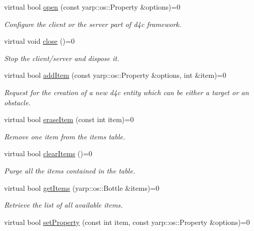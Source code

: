 \begin{DoxyCompactItemize}
\item 
virtual bool \hyperlink{classiCub_1_1d4c_1_1D4C_a75eea02600be0bebb85d0deddd6ecb8e}{open} (const yarp\+::os\+::\+Property \&options)=0
\begin{DoxyCompactList}\small\item\em Configure the client or the server part of d4c framework. \end{DoxyCompactList}\item 
virtual void \hyperlink{classiCub_1_1d4c_1_1D4C_a2b1d795a30a93b5ed76d91a13a545038}{close} ()=0
\begin{DoxyCompactList}\small\item\em Stop the client/server and dispose it. \end{DoxyCompactList}\item 
virtual bool \hyperlink{classiCub_1_1d4c_1_1D4C_ae24c8b8dfa644fbb10ac87741fe0dbc0}{add\+Item} (const yarp\+::os\+::\+Property \&options, int \&item)=0
\begin{DoxyCompactList}\small\item\em Request for the creation of a new d4c entity which can be either a target or an obstacle. \end{DoxyCompactList}\item 
virtual bool \hyperlink{classiCub_1_1d4c_1_1D4C_af002871cc663a24c9a0e2b012b8a020c}{erase\+Item} (const int item)=0
\begin{DoxyCompactList}\small\item\em Remove one item from the items table. \end{DoxyCompactList}\item 
virtual bool \hyperlink{classiCub_1_1d4c_1_1D4C_a19a3d52ae4415d106cbdf30fa7487a7f}{clear\+Items} ()=0
\begin{DoxyCompactList}\small\item\em Purge all the items contained in the table. \end{DoxyCompactList}\item 
virtual bool \hyperlink{classiCub_1_1d4c_1_1D4C_ae922d4224e9be5fc4c72c720c45acef6}{get\+Items} (yarp\+::os\+::\+Bottle \&items)=0
\begin{DoxyCompactList}\small\item\em Retrieve the list of all available items. \end{DoxyCompactList}\item 
virtual bool \hyperlink{classiCub_1_1d4c_1_1D4C_a066c48516b3927a3a5b32d38b69972a0}{set\+Property} (const int item, const yarp\+::os\+::\+Property \&options)=0

\end{DoxyCompactItemize}
